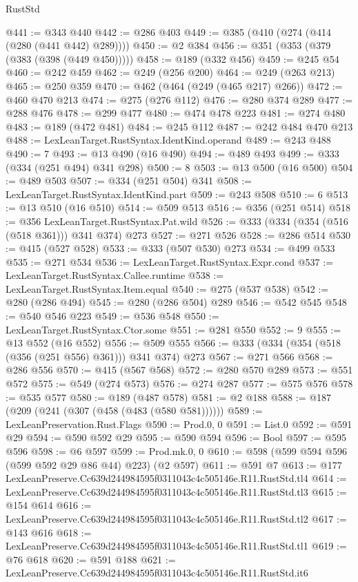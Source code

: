 \begin{lexlean}{RustStd}
\begin{coremodule}
@441 := @343 @440
@442 := @286 @403
@449 := @385 (@410 (@274 (@414 (@280 (@441 @442) @289))))
@450 := @2 @384
@456 := @351 (@353 (@379 (@383 (@398 (@449 @450)))))
@458 := @189 (@332 @456)
@459 := @245 @54
@460 := @242 @459
@462 := @249 (@256 @200)
@464 := @249 (@263 @213)
@465 := @250 @359
@470 := @462 (@464 (@249 (@465 @217) @266))
@472 := @460 @470 @213
@474 := @275 (@276 @112)
@476 := @280 @374 @289
@477 := @288 @476
@478 := @299 @477
@480 := @474 @478 @223
@481 := @274 @480
@483 := @189 (@472 @481)
@484 := @245 @112
@487 := @242 @484 @470 @213
@488 := LexLeanTarget.RustSyntax.IdentKind.operand
@489 := @243 @488
@490 := 7
@493 := @13 @490 (@16 @490)
@494 := @489 @493
@499 := @333 (@334 (@251 @494) @341 @298)
@500 := 8
@503 := @13 @500 (@16 @500)
@504 := @489 @503
@507 := @334 (@251 @504) @341
@508 := LexLeanTarget.RustSyntax.IdentKind.part
@509 := @243 @508
@510 := 6
@513 := @13 @510 (@16 @510)
@514 := @509 @513
@516 := @356 (@251 @514)
@518 := @356 LexLeanTarget.RustSyntax.Pat.wild
@526 := @333 (@334 (@354 (@516 (@518 @361))) @341 @374) @273
@527 := @271 @526
@528 := @286 @514
@530 := @415 (@527 @528)
@533 := @333 (@507 @530) @273
@534 := @499 @533
@535 := @271 @534
@536 := LexLeanTarget.RustSyntax.Expr.cond
@537 := LexLeanTarget.RustSyntax.Callee.runtime
@538 := LexLeanTarget.RustSyntax.Item.equal
@540 := @275 (@537 @538)
@542 := @280 (@286 @494)
@545 := @280 (@286 @504) @289
@546 := @542 @545
@548 := @540 @546 @223
@549 := @536 @548
@550 := LexLeanTarget.RustSyntax.Ctor.some
@551 := @281 @550
@552 := 9
@555 := @13 @552 (@16 @552)
@556 := @509 @555
@566 := @333 (@334 (@354 (@518 (@356 (@251 @556) @361))) @341 @374) @273
@567 := @271 @566
@568 := @286 @556
@570 := @415 (@567 @568)
@572 := @280 @570 @289
@573 := @551 @572
@575 := @549 (@274 @573)
@576 := @274 @287
@577 := @575 @576
@578 := @535 @577
@580 := @189 (@487 @578)
@581 := @2 @188
@588 := @187 (@209 (@241 (@307 (@458 (@483 (@580 @581))))))
@589 := LexLeanPreservation.Rust.Flags
@590 := Prod.{0, 0}
@591 := List.{0}
@592 := @591 @29
@594 := @590 @592 @29
@595 := @590 @594
@596 := Bool
@597 := @595 @596
@598 := @6 @597
@599 := Prod.mk.{0, 0}
@610 := @598 (@599 @594 @596 (@599 @592 @29 @86 @44) @223) (@2 @597)
@611 := @591 @7
@613 := @177 LexLeanPreserve.Cc639d244984595f0311043c4c505146e.R11.RustStd.tl4
@614 := LexLeanPreserve.Cc639d244984595f0311043c4c505146e.R11.RustStd.tl3
@615 := @154 @614
@616 := LexLeanPreserve.Cc639d244984595f0311043c4c505146e.R11.RustStd.tl2
@617 := @143 @616
@618 := LexLeanPreserve.Cc639d244984595f0311043c4c505146e.R11.RustStd.tl1
@619 := @76 @618
@620 := @591 @188
@621 := LexLeanPreserve.Cc639d244984595f0311043c4c505146e.R11.RustStd.it6

\end{coremodule}
\end{lexlean}
